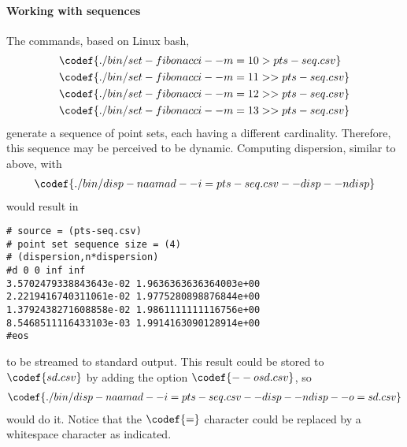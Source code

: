 \paragraph{Working with sequences}

The commands, based on Linux bash,
\begin{align*}
&\codef{./bin/set-fibonacci --m=10 > pts-seq.csv} \\
&\codef{./bin/set-fibonacci --m=11 >> pts-seq.csv} \\
&\codef{./bin/set-fibonacci --m=12 >> pts-seq.csv} \\
&\codef{./bin/set-fibonacci --m=13 >> pts-seq.csv}
\end{align*}
generate a sequence of point sets, each having a different cardinality. Therefore, this sequence may be perceived to be dynamic. Computing dispersion, similar to above, with
\begin{align*}
  \codef{./bin/disp-naamad --i=pts-seq.csv --disp --ndisp}
\end{align*}
would result in
\begin{verbatim}
# source = (pts-seq.csv)
# point set sequence size = (4)
# (dispersion,n*dispersion)
#d 0 0 inf inf
3.5702479338843643e-02 1.9636363636364003e+00
2.2219416740311061e-02 1.9775280898876844e+00
1.3792438271608858e-02 1.9861111111116756e+00
8.5468511116433103e-03 1.9914163090128914e+00
#eos
\end{verbatim}
to be streamed to standard output. This result could be stored to $\codef{sd.csv}$ by adding the option $\codef{--o sd.csv}$, so
\begin{align*}
  \codef{./bin/disp-naamad --i=pts-seq.csv --disp --ndisp --o=sd.csv}
\end{align*}
would do it. Notice that the $\codef{=}$ character could be replaced by a whitespace character as indicated.
